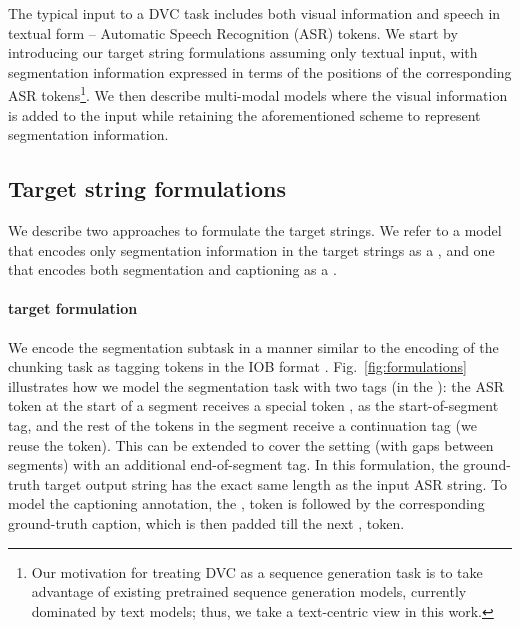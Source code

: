 \documentclass[11pt]{article}
\begin{document}
The typical input to a DVC task includes both visual information and speech in textual form -- Automatic Speech Recognition (ASR) tokens.
We start by introducing our target string formulations assuming only textual input, with segmentation information expressed in terms of the positions of the corresponding ASR tokens\footnote{Our motivation for treating DVC as a sequence generation task is to take advantage of existing pretrained sequence generation models, currently dominated by text models; thus, we take a text-centric view in this work.}.  We then describe multi-modal models where the visual information is added to the input while retaining the aforementioned scheme to represent segmentation information.


\subsection{Target string formulations} 
We describe two approaches to formulate the target strings.  We refer to a model that encodes only segmentation information in the target strings as a \textbf{\segonly}, and one that encodes both segmentation and captioning as a \textbf{\segcap}.

\paragraph{\Hardencoding target formulation}
We encode the segmentation subtask in a manner similar to the encoding of the chunking task as tagging tokens in the IOB format \cite{ramshaw-marcus-1995-text}.  
Fig.~\ref{fig:formulations} illustrates how we model the segmentation task with two tags (in the \partitionsetting):
the ASR token at the start of a segment receives a special token \sep{} as the start-of-segment tag, and the rest of the tokens in the segment receive a continuation tag (we reuse the \pad{} token).  
This can be extended to cover the \vanilla setting (with gaps between segments) with an additional end-of-segment tag.  
In this formulation, the ground-truth target output string has the exact same length as the input ASR string.
To model the captioning annotation, the \sep{} token is followed by the corresponding ground-truth caption, which is then padded till the next \sep{} token. 
\end{document}
